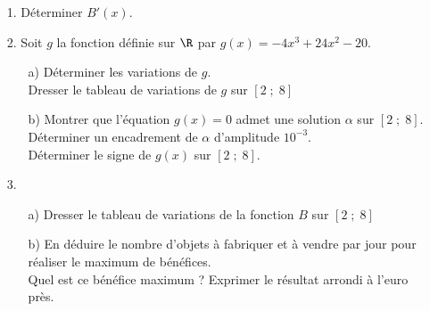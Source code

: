 \begin{itemize}
\item[1.] Déterminer $B'(x)$. \\
\item[2.] Soit $g$ la fonction définie sur $\R$ par $g(x) = -4x^3 + 24x^2 - 20$. 
\begin{itemize}
\item[a)] Déterminer les variations de $g$. \\ Dresser le tableau de variations de $g$ sur $\left[2 \; ; \; 8\right]$
\item[b)] Montrer que l'équation $g(x) = 0$ admet une solution $\alpha$ sur $\left[2 \; ; \; 8\right]$. \\ Déterminer un encadrement de $\alpha$ d'amplitude $10^{-3}$. \\ Déterminer le signe de $g\left(x\right)$ sur $\left[2 \; ; \; 8\right]$. \\
\end{itemize}
\item[3.]
\begin{itemize}
\item[a)] Dresser le tableau de variations de la fonction $B$ sur $\left[2 \; ; \; 8\right]$ 
\item[b)] En déduire le nombre d'objets à fabriquer et à vendre par jour pour réaliser le maximum de bénéfices. \\ Quel est ce bénéfice maximum ? Exprimer le résultat arrondi à l'euro près.
\end{itemize}
\end{itemize}

\vspace*{.3cm}

